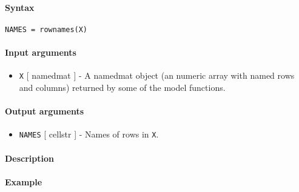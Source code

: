 


	\paragraph{Syntax}

\begin{verbatim}
NAMES = rownames(X)
\end{verbatim}

\paragraph{Input arguments}

\begin{itemize}
\itemsep1pt\parskip0pt
\item
  \texttt{X} {[} namedmat {]} - A namedmat object (an numeric array with
  named rows and columns) returned by some of the model functions.
\end{itemize}

\paragraph{Output arguments}

\begin{itemize}
\itemsep1pt\parskip0pt
\item
  \texttt{NAMES} {[} cellstr {]} - Names of rows in \texttt{X}.
\end{itemize}

\paragraph{Description}

\paragraph{Example}


